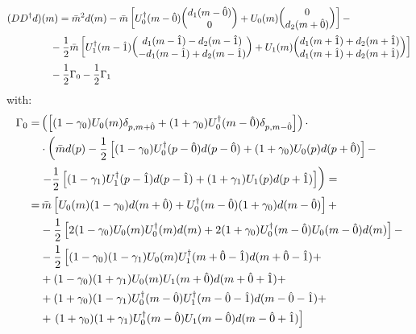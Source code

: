 \begin{equation*}
        \begin{split}
       & (DD^\dagger d)(m) = \Bar{m}^2 d(m) - \Bar{m}\left[ U_0^\dagger(m - \hat{0}) \mqty(d_1(m-\hat{0}) \\ 0 ) + U_0(m) \mqty(0 \\ d_2(m+\hat{0})) \right] - \\ 
       & \hspace{15 mm} - \frac{1}{2} \Bar{m} \left[ U_1^{\dagger}(m-\hat{1}) \mqty(d_1 (m-\hat{1}) - d_2(m-\hat{1}) \\ - d_1(m-\hat{1}) + d_2 (m-\hat{1}) ) + U_1(m) \mqty( d_1(m + \hat{1})  + d_2(m + \hat{1}) \\ d_1(m + \hat{1})  + d_2(m + \hat{1}) ) \right] \\
       & \hspace{15 mm} - \frac{1}{2} \Gamma_0 - \frac{1}{2}\Gamma_1
        \end{split}
\end{equation*}
with:
\begin{equation*}
    \begin{split}
       \Gamma_0 = & \left( \left[ (1 - \gamma_0) U_0(m) \delta_{p, m+\hat{0}} + (1 + \gamma_0) U_0^\dagger (m - \hat{0}) \delta_{p, m - \hat{0}} \right]\right) \cdot \\
       & \cdot \left( \Bar{m} d(p) - \frac{1}{2}\left[ (1 - \gamma_0) U_0^\dagger(p - \hat{0}) d(p-\hat{0}) + (1 + \gamma_0) U_0 (p) d(p+\hat{0}) \right] - \right. \\ 
       & \left. - \frac{1}{2}\left[ (1 - \gamma_1) U_1^\dagger(p - \hat{1}) d(p-\hat{1}) + (1 + \gamma_1) U_1 (p) d(p+\hat{1}) \right] \right) = \\
       = & \, \Bar{m} \left[ U_0(m)(1 - \gamma_0) d(m+\hat{0}) + U_0^{\dagger}(m - \hat{0}) (1 + \gamma_0) d(m-\hat{0}) \right] + \\
       & - \frac{1}{2} \left[ 2(1 - \gamma_0) U_0(m)U_0^\dagger(m) d(m) + 2(1 + \gamma_0) U_0^\dagger(m-\hat{0}) U_0(m - \hat{0}) d(m) \right] - \\
       & - \frac{1}{2}\left[ (1-\gamma_0)(1-\gamma_1) U_0(m)U_1^\dagger(m+\hat{0}-\hat{1}) d(m+\hat{0} - \hat{1}) + \right. \\ 
       & + (1-\gamma_0)(1 + \gamma_1) U_0(m)U_1(m+\hat{0})d(m+\hat{0}+\hat{1}) +  \\ 
       & + (1+\gamma_0)(1-\gamma_1)U_0^\dagger(m-\hat{0}) U_1^\dagger(m - \hat{0} - \hat{1}) d(m - \hat{0} - \hat{1}) + \\ 
       & + \left. (1+\gamma_0)(1+\gamma_1)U_0^\dagger(m-\hat{0}) U_1(m-\hat{0}) d(m - \hat{0} + \hat{1}) \right]
    \end{split}
\end{equation*}
